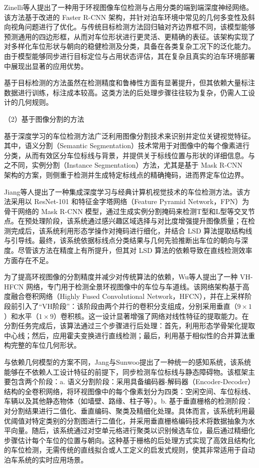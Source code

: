Zinelli等人\cite{zinelli2019deep}提出了一种用于环视图像车位检测与占用分类的端到端深度神经网络。该方法基于改进的 Faster R-CNN 架构，并针对泊车环境中常见的几何多变性及斜向视角问题进行了优化。与传统目标检测方法回归轴对齐边界框不同，该模型能够预测通用的四边形框，从而对车位形状进行更灵活、更精确的表征。该架构实现了对多样化车位形状与朝向的稳健检测及分类，具备在各类复杂工况下的泛化能力。由于模型能够同步进行目标定位与占用状态评估，其在复杂且真实的泊车环境部署中展现出显著的应用优势。

基于目标检测的方法虽然在检测精度和鲁棒性方面有显著提升，但其依赖大量标注数据进行训练，标注成本较高。这类方法的后处理步骤往往较为复杂，仍需人工设计的几何规则。


（2）基于图像分割的方法

基于深度学习的车位检测方法广泛利用图像分割技术来识别并定位关键视觉特征。其中，语义分割（Semantic Segmentation）技术常用于对图像中的每个像素进行分类，从而有效区分车位标线与背景，并提供关于标线位置与形状的详细信息。与之不同，实例分割（Instance Segmentation）方法，尤其是基于 Mask R-CNN~\cite{he2017mask} 架构的方案，则侧重于检测并生成特定标线点的精确掩码，进而界定车位边界。

Jiang等人\cite{jiang2020detection}提出了一种集成深度学习与经典计算机视觉技术的车位检测方法。该方法采用以 ResNet-101 和特征金字塔网络（Feature Pyramid Network，FPN）为骨干网络的 Mask R-CNN 模型，通过生成实例分割掩码来检测T型和L型等交叉节点。在预处理阶段，该系统通过感兴趣区域选择与对比度增强提升图像质量；在检测完成后，该系统利用形态学操作对掩码进行细化，并结合 LSD 算法提取结构线与引导线。最终，该系统依据标线点分类结果与几何先验推断出车位的朝向与深度。尽管该方法在精度上有所提升，但其对 LSD 算法的依赖导致在直线检测效率方面存在不足。

为了提高环视图像的分割精度并减少对传统算法的依赖，Wu等人\cite{wu2018vh}提出了一种 VH-HFCN 网络，专门用于检测全景环视图像中的车位与车道线。该网络架构基于高度融合卷积网络（Highly Fused Convolutional Network，HFCN），并在上采样阶段前引入了“VH阶段”：该阶段由两个并行的卷积分支组成，分别采用垂直（$9\times1$）和水平（$1\times9$）卷积核。这一设计显著增强了网络对线性特征的提取能力。在分割任务完成后，该算法通过三个步骤进行后处理：首先，利用形态学骨架化提取中心线；然后，应用霍夫变换进行直线检测；最后，利用基于相似性的合并算法重构完整的车位几何形状。

与依赖几何模型的方案不同，Jang与Sunwoo\cite{jang2019semantic}提出了一种统一的感知系统，该系统能够在不依赖人工设计特征的前提下，同步检测车位标线与静态障碍物。该框架主要包含两个阶段：a. 语义分割阶段：采用具备编码器-解码器（Encoder-Decoder）结构的全卷积网络，将环视图像中的每个像素划分为四类：空闲空间、车位标线、车辆以及其他静态物体（如墙壁、路缘、柱子等）。b. 基于垂直栅格的检测阶段：对分割结果进行二值化、垂直编码、聚类及精细化处理。具体而言，该系统利用最优阈值对特定类别的分割图进行二值化，并采用垂直栅格编码技术将数据抽象为水平向量。随后，该系统通过对空单元格进行聚类以识别候选车位，最后通过精细化步骤估计每个车位的位置与朝向。这种基于栅格的后处理方式实现了高效且结构化的车位检测，无需传统的直线拟合或人工定义的启发式规则，使其非常适用于自动泊车系统的实时应用场景。

